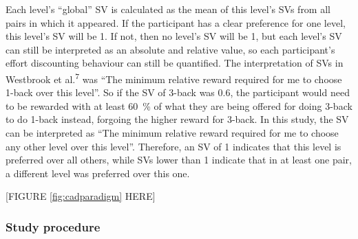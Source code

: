 \documentclass[
  man,floatsintext]{apa6}
\begin{document}
Each level's ``global'' SV is calculated as the mean of this level's SVs from all pairs in which it appeared.
If the participant has a clear preference for one level, this level's SV will be 1.
If not, then no level's SV will be 1, but each level's SV can still be interpreted as an absolute and relative value, so each participant's effort discounting behaviour can still be quantified.
The interpretation of SVs in Westbrook et al.\textsuperscript{7} was ``The minimum relative reward required for me to choose 1-back over this level''.
So if the SV of 3-back was 0.6, the participant would need to be rewarded with at least 60~\% of what they are being offered for doing 3-back to do 1-back instead, forgoing the higher reward for 3-back.
In this study, the SV can be interpreted as ``The minimum relative reward required for me to choose any other level over this level''.
Therefore, an SV of 1 indicates that this level is preferred over all others, while SVs lower than 1 indicate that in at least one pair, a different level was preferred over this one.

{[}FIGURE \ref{fig:cadparadigm} HERE{]}

\hypertarget{study-procedure}{%
\subsubsection{Study procedure}\label{study-procedure}}
\end{document}
